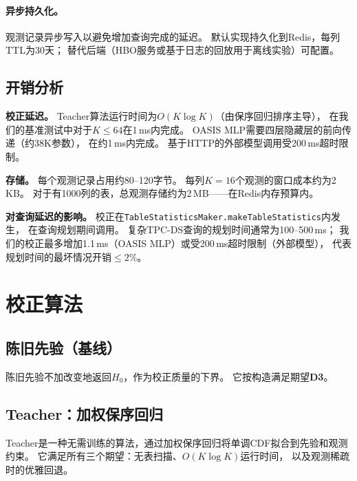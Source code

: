 \documentclass[runningheads]{llncs}
\begin{document}
\paragraph{异步持久化。}
观测记录异步写入以避免增加查询完成的延迟。
默认实现持久化到Redis，每列TTL为30天；
替代后端（HBO服务或基于日志的回放用于离线实验）可配置。

\subsection{开销分析}
\label{sec:overhead}

\textbf{校正延迟。}
Teacher算法运行时间为$O(K \log K)$（由保序回归排序主导），
在我们的基准测试中对于$K \leq 64$在1\,ms内完成。
OASIS MLP需要四层隐藏层的前向传递（约38K参数），
在约1\,ms内完成。
基于HTTP的外部模型调用受200\,ms超时限制。

\textbf{存储。}
每个观测记录占用约80--120字节。
每列$K{=}16$个观测的窗口成本约为2\,KB。
对于有1000列的表，总观测存储约为2\,MB——在Redis内存预算内。

\textbf{对查询延迟的影响。}
校正在\texttt{TableStatisticsMaker.makeTableStatistics}内发生，
在查询规划期间调用。
复杂TPC-DS查询的规划时间通常为100--500\,ms；
我们的校正最多增加1.1\,ms（OASIS MLP）或受200\,ms超时限制（外部模型），
代表规划时间的最坏情况开销$\leq 2\%$。

\section{校正算法}
\label{sec:algorithms}

\subsection{陈旧先验（基线）}

陈旧先验不加改变地返回$H_0$，作为校正质量的下界。
它按构造满足期望\textbf{D3}。

\subsection{Teacher：加权保序回归}
\label{sec:teacher}

Teacher是一种无需训练的算法，通过加权保序回归将单调CDF拟合到先验和观测约束。
它满足所有三个期望：无表扫描、$O(K \log K)$运行时间，
以及观测稀疏时的优雅回退。
\end{document}
